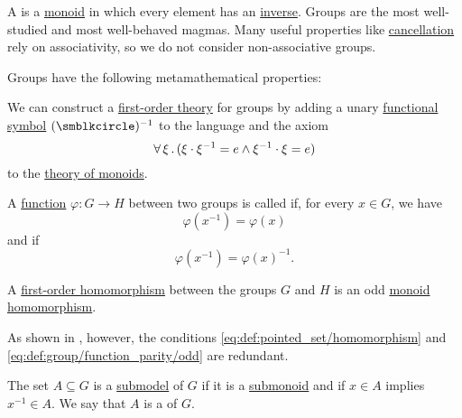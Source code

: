 \begin{definition}\label{def:group}
  A  is a \hyperref[def:monoid]{monoid} in which every element has an \hyperref[def:monoid_inverse_element]{inverse}. Groups are the most well-studied and most well-behaved magmas. Many useful properties like \hyperref[thm:def:group/properties/cancellative]{cancellation} rely on associativity, so we do not consider non-associative groups.

  Groups have the following metamathematical properties:
  \begin{thmenum}
     We can construct a \hyperref[def:first_order_theory]{first-order theory} for groups by adding a unary \hyperref[def:first_order_language/func]{functional symbol} \( (\anon)^{-1} \) to the language and the axiom
    \begin{equation}\label{eq:def:group/theory/inverse_axiom}
      \forall \thinspace \xi \thinspace . \thinspace (\xi \cdot \xi^{-1} = e \wedge \xi^{-1} \cdot \xi = e)
    \end{equation}
    to the \hyperref[def:monoid/theory]{theory of monoids}.

     A \hyperref[def:function]{function} \( \varphi: G \to H \) between two groups is called  if, for every \( x \in G \), we have
    \begin{equation}\label{eq:def:group/function_parity/even}
      \varphi(x^{-1}) = \varphi(x)
    \end{equation}
    and  if
    \begin{equation}\label{eq:def:group/function_parity/odd}
      \varphi(x^{-1}) = \varphi(x)^{-1}.
    \end{equation}

     A \hyperref[def:first_order_homomorphism]{first-order homomorphism} between the groups \( G \) and \( H \) is an odd \hyperref[def:monoid/homomorphism]{monoid homomorphism}.

    As shown in , however, the conditions \eqref{eq:def:pointed_set/homomorphism} and \eqref{eq:def:group/function_parity/odd} are redundant.

     The set \( A \subseteq G \) is a \hyperref[thm:substructure_is_model]{submodel} of \( G \) if it is a \hyperref[def:monoid/submodel]{submonoid} and if \( x \in A \) implies \( x^{-1} \in A \). We say that \( A \) is a  of \( G \).


\end{thmenum}
\end{definition}
